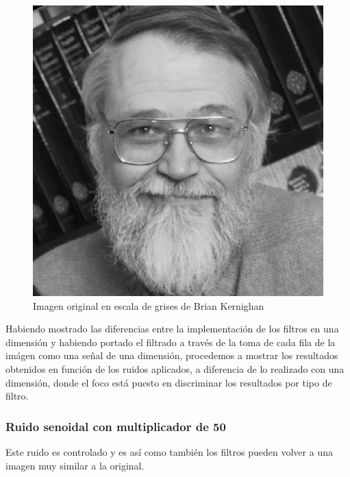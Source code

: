 \begin{figure}[H]
\begin {center}
\includegraphics[width=500pt]{imagenes/brian_kernighan.png}
\end {center}
\caption{Imagen original en escala de grises de Brian Kernighan}
\label{fig:SinProm}
\end{figure}

Habiendo mostrado las diferencias entre la implementaci\'on de los filtros en
una dimensi\'on y habiendo portado el filtrado a trav\'es de la toma de cada
fila de la im\'agen como una se\~nal de una dimensi\'on, procedemos a mostrar
los resultados obtenidos en funci\'on de los ruidos aplicados, a diferencia de
lo realizado con una dimensi\'on, donde el foco est\'a puesto en discriminar los
resultados por tipo de filtro.
\subsubsection{Ruido senoidal con multiplicador de 50}

Este ruido es controlado y es as\'i como tambi\'en los filtros pueden volver a
una imagen muy similar a la original.

